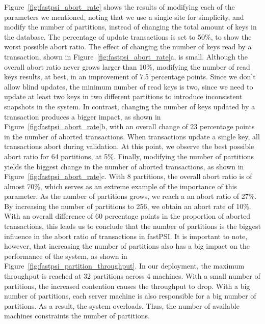 Figure~\ref{fig:fastpsi_abort_rate} shows the results of modifying each of the parameters we mentioned, noting that we use a single site for simplicity, and modify the number of partitions, instead of changing the total amount of keys in the database. The percentage of update transactions is set to 50\%, to show the worst possible abort ratio. The effect of changing the number of keys read by a transaction, shown in Figure~\ref{fig:fastpsi_abort_rate}a, is small. Although the overall abort ratio never grows larger than 10\%, modifying the number of read keys results, at best, in an improvement of 7.5 percentage points. Since we don't allow blind updates, the minimum number of read keys is two, since we need to update at least two keys in two different partitions to introduce inconsistent snapshots in the system. In contrast, changing the number of keys updated by a transaction produces a bigger impact, as shown in Figure~\ref{fig:fastpsi_abort_rate}b, with an overall change of 23 percentage points in the number of aborted transactions. When transactions update a single key, all transactions abort during validation. At this point, we observe the best possible abort ratio for 64 partitions, at 5\%. Finally, modifying the number of partitions yields the biggest change in the number of aborted transactions, as shown in Figure~\ref{fig:fastpsi_abort_rate}c. With 8 partitions, the overall abort ratio is of almost 70\%, which serves as an extreme example of the importance of this parameter. As the number of partitions grows, we reach a an abort ratio of 27\%. By increasing the number of partitions to 256, we obtain an abort rate of 10\%. With an overall difference of 60 percentage points in the proportion of aborted transactions, this leads us to conclude that the number of partitions is the biggest influence in the abort ratio of transactions in fastPSI. It is important to note, however, that increasing the number of partitions also has a big impact on the performance of the system, as shown in Figure~\ref{fig:fastpsi_partition_throughput}. In our deployment, the maximum throughput is reached at 32 partitions across 4 machines. With a small number of partitions, the increased contention causes the throughput to drop. With a big number of partitions, each server machine is also responsible for a big number of partitions. As a result, the system overloads. Thus, the number of available machines constraints the number of partitions.

